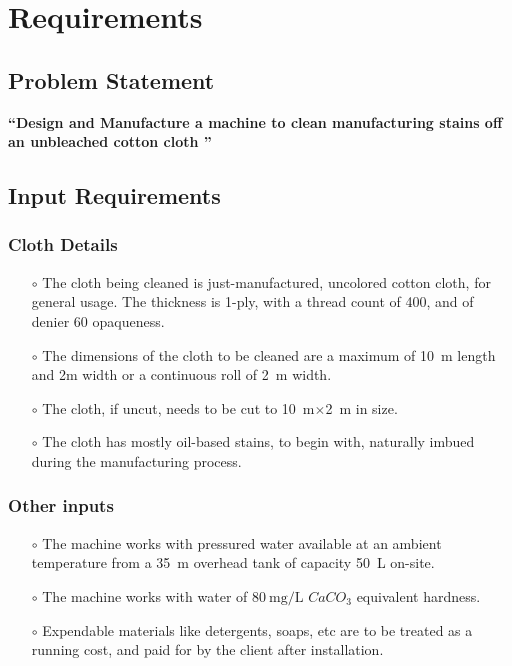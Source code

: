 \section{Requirements}
\subsection{Problem Statement}
\begin{center}
    \textbf{``Design and Manufacture a machine to clean manufacturing stains off an unbleached cotton cloth ''}
\end{center}

\subsection{Input Requirements}
\subsubsection{Cloth Details}
\begin{itemize}
    \item[$\scriptstyle\circ$] The cloth being cleaned is just-manufactured, uncolored cotton cloth, for general usage. The thickness is 1-ply, with a \gls{thread count} of 400, and of \gls{denier} 60 \gls{opaqueness}.
    \item[$\scriptstyle\circ$] The dimensions of the cloth to be cleaned are a maximum of \SI{10}{\meter} length and 2m width or a continuous roll of \SI{2}{\meter} width.
    \item[$\scriptstyle\circ$] The cloth, if uncut, needs to be cut to \SI{10}{\meter}$\times$\SI{2}{\meter} in size.
    \item[$\scriptstyle\circ$] The cloth has mostly oil-based stains, to begin with, naturally imbued during the manufacturing process.
\end{itemize}
\subsubsection{Other inputs}
\begin{itemize}
    \item[$\scriptstyle\circ$] The machine works with pressured water available at an ambient temperature from a \SI{35}{\meter} overhead tank of capacity \SI{50}{\liter} on-site. 
    \item[$\scriptstyle\circ$] The machine works with water of $\SI{80}{\milli\gram\per\liter}$ $CaCO_3$ equivalent \gls{hardness}.
    \item[$\scriptstyle\circ$] \gls{Expendable materials} like detergents, soaps, etc are to be treated as a running cost, and paid for by the client after installation.
\end{itemize}
